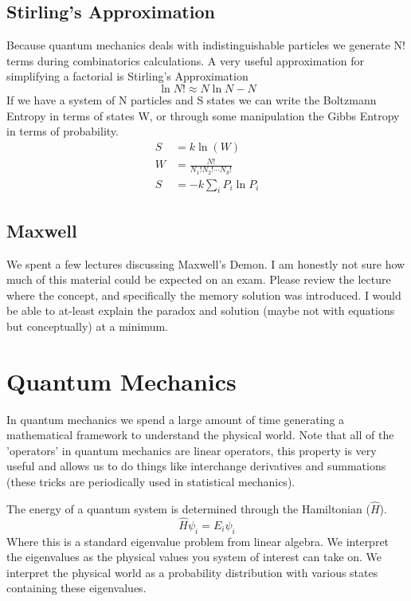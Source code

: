 \documentclass{article}
\begin{document}
\subsection{Stirling's Approximation}
Because quantum mechanics deals with indistinguishable particles we generate N! terms during combinatorics calculations. 
A very useful approximation for simplifying a factorial is Stirling's Approximation
\begin{equation}
    \ln N! \approx N\ln N - N
\end{equation}
If we have a system of N particles and S states we can write the Boltzmann Entropy in terms of states W, or through some manipulation the Gibbs Entropy in terms of probability. 
\begin{equation}
    \begin{split}
             S &= k\ln(W) \\
              W &= \frac{N!}{N_1!N_2!\cdots N_S!} \\
               S &= -k\sum_i P_i \ln P_i
    \end{split}
\end{equation}

\subsection{Maxwell}
We spent a few lectures discussing Maxwell's Demon. 
I am honestly not sure how much of this material could be expected on an exam. 
Please review the lecture where the concept, and specifically the memory solution was introduced. 
I would be able to at-least explain the paradox and solution (maybe not with equations but conceptually) at a minimum. 

\section{Quantum Mechanics}
In quantum mechanics we spend a large amount of time generating a mathematical framework to understand the physical world. 
Note that all of the 'operators' in quantum mechanics are linear operators, this property is very useful and allows us to do things like interchange derivatives and summations (these tricks are periodically used in statistical mechanics).

The energy of a quantum system is determined through the Hamiltonian ($\hat{H}$). 
\begin{equation}
    \hat{H}\psi_i = E_i \psi_i
\end{equation}
Where this is a standard eigenvalue problem from linear algebra. 
We interpret the eigenvalues as the physical values you system of interest can take on.
We interpret the physical world as a probability distribution with various states containing these eigenvalues. 
\end{document}
